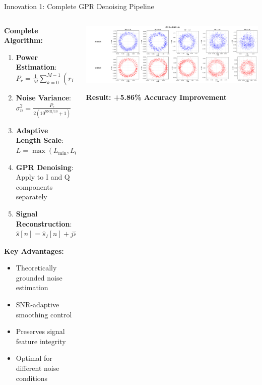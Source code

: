 \documentclass[aspectratio=169]{beamer}
\begin{document}
\begin{frame}{Innovation 1: Complete GPR Denoising Pipeline}
\begin{columns}
\begin{column}{0.6\textwidth}
\textbf{Complete Algorithm:}
\begin{enumerate}
\item \textbf{Power Estimation}: $P_r = \frac{1}{M}\sum_{k=0}^{M-1}(r_I[k]^2+r_Q[k]^2)$
\item \textbf{Noise Variance}: $\sigma_n^2 = \frac{P_r}{2(10^{\text{SNR}/10} + 1)}$
\item \textbf{Adaptive Length Scale}: $L = \max(L_{\min}, L_0(1 + \text{SNR}/20))$
\item \textbf{GPR Denoising}: Apply to I and Q components separately
\item \textbf{Signal Reconstruction}: $\hat{s}[n] = \hat{s}_I[n] + j\hat{s}_Q[n]$
\end{enumerate}

\vspace{0.3cm}
\textbf{Key Advantages:}
\begin{itemize}
\item \textcolor{zjutgreen}{Theoretically grounded noise estimation}
\item \textcolor{zjutgreen}{SNR-adaptive smoothing control}
\item \textcolor{zjutgreen}{Preserves signal feature integrity}
\item \textcolor{zjutgreen}{Optimal for different noise conditions}
\end{itemize}
\end{column}
\begin{column}{0.4\textwidth}
\includegraphics[width=\textwidth]{../paper/figure/constellation_denoising.png}

\vspace{0.3cm}
\begin{center}
\textcolor{zjutblue}{\textbf{Result: +5.86\% Accuracy Improvement}}
\end{center}
\end{column}
\end{columns}
\end{frame}
\end{document}
